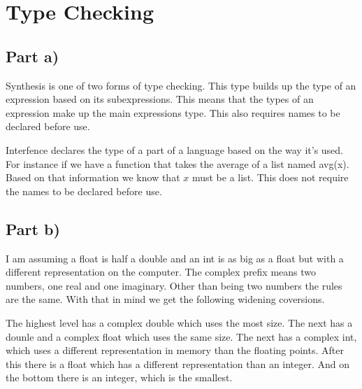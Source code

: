 \documentclass[paper=a4, fontsize=11pt]{scrartcl} %
\numberwithin{equation}{section} %
\numberwithin{figure}{section} %
\numberwithin{table}{section} %
\begin{document}
\section{Type Checking}
\subsection{Part a)}
Synthesis is one of two forms of type checking.
This type builds up the type of an expression based on its subexpressions.
This means that the types of an expression make up the main expressions type.
This also requires names to be declared before use.

Interfence declares the type of a part of a language based on the way it's used.
For instance if we have a function that takes the average of a list named avg(x).
Based on that information we know that $x$ must be a list.
This does not require the names to be declared before use.
\subsection{Part b)}
I am assuming a float is half a double and an int is as big as a float but with a different representation on the computer.
The complex prefix means two numbers, one real and one imaginary. Other than being two numbers the rules are the same.
With that in mind we get the following widening coversions.

The highest level has a complex double which uses the most size.
The next has a dounle and a complex float which uses the same size.
The next has a complex int, which uses a different representation in memory than the floating points.
After this there is a float which has a different representation than an integer.
And on the bottom there is an integer, which is the smallest.
\end{document}
